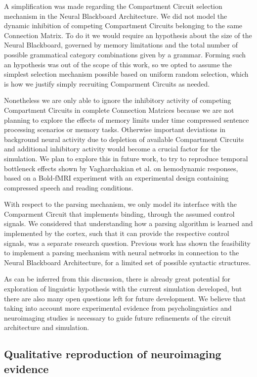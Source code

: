 \documentclass[10pt]{article}
\begin{document}
A simplification was made regarding the Compartment Circuit selection mechanism in the Neural Blackboard Architecture.
We did not model the dynamic inhibition of competing Compartment Circuits belonging to the same Connection Matrix.
To do it we would require an hypothesis about the size of the Neural Blackboard, governed by memory limitations and the total number of possible grammatical category combinations given by a grammar.
Forming such an hypothesis was out of the scope of this work, so we opted to assume the simplest selection mechanism possible based on uniform random selection, which is how we justify simply recruiting Comparment Circuits as needed.

Nonetheless we are only able to ignore the inhibitory activity of competing Compartment Circuits in complete Connection Matrices because we are not planning to explore the effects of memory limits under time compressed sentence processing scenarios or memory tasks.
Otherwise important deviations in background neural activity due to depletion of available Compartment Circuits and additional inhibitory activity would become a crucial factor for the simulation.
We plan to explore this in future work, to try to reproduce temporal bottleneck effects shown by Vagharchakian et al. on hemodynamic responses, based on a Bold-fMRI experiment with an experimental design containing compressed speech and reading conditions\cite{Vagharchakian_2012}.

With respect to the parsing mechanism, we only model its interface with the Comparment Circuit that implements binding, through the assumed control signals.
We considered that understanding how a parsing algorithm is learned and implemented by the cortex, such that it can provide the respective control signals, was a separate research question.
Previous work has shown the feasibility to implement a parsing mechanism with neural networks in connection to the Neural Blackboard Architecture\cite{van_der_Velde_2010}, for a limited set of possible syntactic structures.

As can be inferred from this discussion, there is already great potential for exploration of linguistic hypothesis with the current simulation developed, but there are also many open questions left for future development.
We believe that taking into account more experimental evidence from psycholinguistics and neuroimaging studies is necessary to guide future refinements of the circuit architecture and simulation.


\subsection{Qualitative reproduction of neuroimaging evidence}
\end{document}
